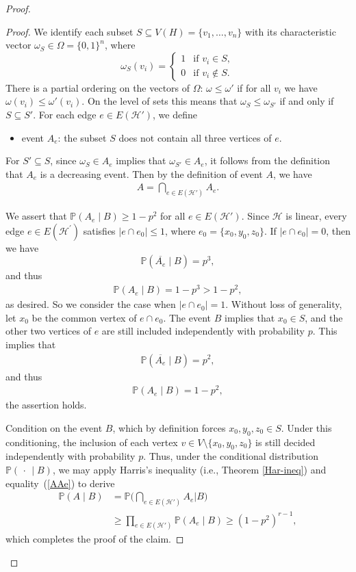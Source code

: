 \documentclass[10pt,a4paper]{amsart}
\newcommand{\bP}{\mathbb{P}}
\newcommand{\cH}{\mathcal{H}}
\begin{document}
\begin{proof}
\begin{proof}
We identify each subset $S\subseteq V(H)=\{v_1,\dots,v_n\}$ with its characteristic vector
$\omega_S\in\Omega=\{0,1\}^n$, where
\[
\omega_S(v_i)=
\begin{cases}
1 & \text{if } v_i\in S,\\
0 & \text{if } v_i\notin S.
\end{cases}
\]
There is a partial ordering on the vectors of $\Omega$:  $\omega\le \omega'$ if for all $v_i$ we have 
$\omega(v_i)\le \omega'(v_i)$. On the level of sets this  means that $\omega_S\le \omega_{S'}$ if and only if $S\subseteq S'$. 
For each edge $e\in E(\cH')$, we define
\begin{itemize}
\item event $A_e$: the subset $S$  does not contain all three vertices of $e$.
\end{itemize}
For  $S'\subseteq S$, since $\omega_S \in A_e$   implies that $\omega_{S'} \in A_e$, it follows from the definition that $A_e$ is a decreasing event. Then by the definition of event $A$, we have 
\begin{align}\label{AAe}
A=\bigcap_{e\in E(\cH')}A_e.
\end{align}

We assert that $\mathbb P(A_e\mid B)\ge 1-p^2$ for all $e\in E(\cH')$. Since $\cH$ is linear, every edge $e \in E\left(\cH^{\prime}\right)$ satisfies $\left|e \cap e_0\right| \leq 1$, where $e_0=\{x_0,y_0,z_0\}$.  If $|e \cap e_0|=0$,  then we have 
$$
\mathbb{P}(\overline{A_e} \mid B)=p^3,
$$
and thus 
\begin{align*}
\mathbb{P}\left(A_e \mid B\right)=1-p^3 > 1-p^2,
\end{align*}
as desired. So we consider the case when $\left|e \cap e_0\right|=1$. Without loss of  generality, let $x_0$ be the common vertex of $e\cap e_0$. The event $B$ implies that  $x_0 \in S$, and the other two vertices of $e$ are still included independently with probability $p$. This implies that
\begin{align*}
\mathbb{P}(\overline{A_e} \mid B)=p^2, 
\end{align*}
and thus 
\begin{align*}
 \mathbb{P}\left(A_e \mid B\right)=1-p^2,
 \end{align*}
the assertion holds.

Condition on the event $B$, which by definition forces $x_0,y_0,z_0\in S$.
Under this conditioning, the inclusion of each vertex $v\in V\setminus\{x_0,y_0,z_0\}$ is still decided
independently with probability $p$. 
Thus, under the conditional distribution $\bP(\,\cdot\,\mid B)$, we may apply Harris's inequality (i.e., Theorem \ref{Har-ineq}) and equality~(\ref{AAe}) to derive 
\begin{align*}
\mathbb P(A\mid B)&=\mathbb P\Big(\bigcap_{e\in E(\mathcal H')}A_e \Big| B\Big)\\
&\ge \prod_{e\in E(\mathcal H')}\mathbb P(A_e\mid B)
\ge (1-p^2)^{r-1},
\end{align*}
which completes the proof of the claim.
\end{proof}



\end{proof}
\end{document}

